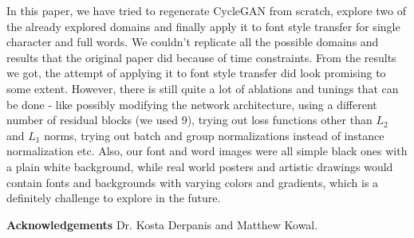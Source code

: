 \documentclass[10pt,twocolumn,letterpaper]{article}
\begin{document}
In this paper, we have tried to regenerate CycleGAN \cite{cyclegan} from scratch, explore two of the already explored domains and finally apply it to font style transfer
for single character and full words. We couldn't replicate all the possible domains
and results that the original paper did because of time constraints. From the results
we got, the attempt of applying it to font style transfer did look promising to some extent.
However, there is still quite a lot of ablations and tunings that can be done - like possibly modifying
the network architecture, using a different number of residual blocks (we used 9), trying out loss 
functions other than $L_2$ and $L_1$ norms, trying out batch and group normalizations instead of instance 
normalization etc. Also, our font and word images were all simple
black ones with a plain white background, while real world posters and artistic drawings would
contain fonts and backgrounds with varying colors and gradients, which is a definitely challenge
to explore in the future.

\noindent \textbf{Acknowledgements} Dr. Kosta Derpanis and Matthew Kowal.

{\small


}
\end{document}
